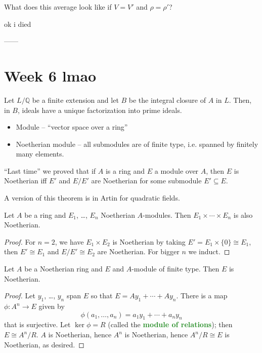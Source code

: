 \documentclass[10pt]{scrartcl}
\providecommand{\QQ}{\mathbb Q}
\providecommand{\ii}{\item}
\providecommand{\vocab}[1]{{\textbf{\textcolor{ForestGreen}{#1}}}}
\begin{document}
\begin{exercise}
	What does this average look like if $V = V'$ and $\rho = \rho'$?
\end{exercise}

ok i died

------
\pagebreak
\setcounter{section}{5}
\section{Week 6 lmao}

\begin{theorem}
	Let $L/\QQ$ be a finite extension and let $B$ be
	the integral closure of $A$ in $L$.
	Then, in $B$, ideals have a unique factorization into prime ideals.
\end{theorem}

\begin{itemize}
	\ii Module -- ``vector space over a ring''
	\ii Noetherian module -- all submodules are of finite type,
	i.e. spanned by finitely many elements.
\end{itemize}

``Last time'' we proved that if $A$ is a ring and $E$ a module over $A$,
then $E$ is Noetherian iff $E'$ and $E/E'$ are Noetherian
for some submodule $E'\subseteq E$.
\begin{remark}
	A version of this theorem is in Artin for quadratic fields.
\end{remark}

\begin{corollary}
	Let $A$ be a ring and $E_1$, \dots, $E_n$ Noetherian $A$-modules.
	Then $E_1\times\cdots\times E_n$ is also Noetherian.
\end{corollary}

\begin{proof}
	For $n = 2$, we have $E_1\times E_2$ is Noetherian by taking
	$E' = E_1\times\{0\}\cong E_1$,
	then $E'\cong E_1$ and $E/E'\cong E_2$ are Noetherian.
	For bigger $n$ we induct.
\end{proof}

\begin{corollary}
	Let $A$ be a Noetherian ring and $E$ and $A$-module of finite type.
	Then $E$ is Noetherian.
\end{corollary}

\begin{proof}
	Let $y_1$, \dots, $y_n$ span $E$ so that
	$E = Ay_1 + \cdots + Ay_n$. There is a map $\phi\colon A^n\to E$ given by
	\[\phi(a_1, \dots, a_n) = a_1y_1 + \cdots + a_ny_n\]
	that is surjective. Let $\ker\phi = R$
	(called the \vocab{module of relations}); then $E\cong A^n/R$.
	$A$ is Noetherian, hence $A^n$ is Noetherian, hence
	$A^n/R\cong E$ is Noetherian, as desired.
\end{proof}
\end{document}
